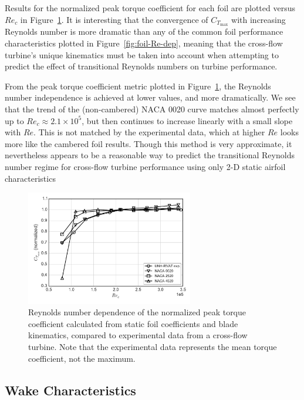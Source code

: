 \documentclass[energies,article,accept,moreauthors,pdftex,12pt,a4paper]{mdpi}
\begin{document}
Results for the normalized peak torque coefficient for each foil are plotted
versus $Re_c$ in Figure~\ref{fig:foils-C_T-Re-dep}. It is interesting that the
convergence of $C_{T_\mathrm{max}}$ with increasing Reynolds number is more
dramatic than any of the common foil performance characteristics plotted in
Figure~\ref{fig:foil-Re-dep}, meaning that the cross-flow turbine's unique
kinematics must be taken into account when attempting to predict the effect of
transitional Reynolds numbers on turbine performance.

From the peak torque coefficient metric plotted in
Figure~\ref{fig:foils-C_T-Re-dep}, the Reynolds number independence is achieved
at lower values, and more dramatically. We see that the trend of the
(non-cambered) NACA 0020 curve matches almost perfectly up to $Re_c \approx 2.1
\times 10^5$, but then continues to increase linearly with a small slope with
$Re$. This is not matched by the experimental data, which at higher $Re$ looks
more like the cambered foil results. Though this method is very approximate, it
nevertheless appears to be a reasonable way to predict the transitional Reynolds
number regime for cross-flow turbine performance using only 2-D static airfoil
characteristics

\begin{figure}[ht!]
\centering

\includegraphics[width=0.65\textwidth]{figures/cft_re_dep_foils}

\caption{Reynolds number dependence of the normalized peak torque coefficient
    calculated from static foil coefficients and blade kinematics, compared to
    experimental data from a cross-flow turbine. Note that the experimental data
    represents the mean torque coefficient, not the maximum.}

\label{fig:foils-C_T-Re-dep}
\end{figure}


\subsection{Wake Characteristics}
\end{document}
